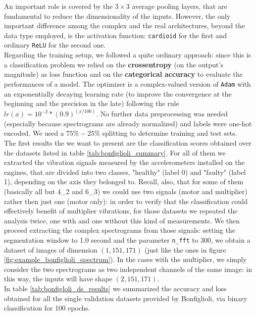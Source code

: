 \documentclass[../main.tex]{subfiles}
\begin{document}
An important role is covered by the $3\times 3$ average pooling layers, that are fundamental to reduce the dimensionality of the inputs. However, the only important difference among the complex and the real architectures, beyond the data type employed, is the activation function: \texttt{cardioid} for the first and ordinary \texttt{ReLU} for the second one.\\
Regarding the training setup, we followed a quite ordinary approach: since this is a classification problem we relied on the \textbf{crossentropy} (on the output's magnitude) as loss function and on the \textbf{categorical accuracy} to evaluate the performances of a model. The optimizer is a complex-valued version of \texttt{Adam} with an exponentially decaying learning rate (to improve the convergence at the beginning and the precision in the late) following the rule $lr(x) = 10^{-2}*(0.9)^{(x/100)}$. No further data preprocessing was needed (especially because spectrograms are already normalized) and labels were one-hot encoded. We used a $75\%-25\%$ splitting to determine training and test sets.\\
The first results the we want to present are the classification scores obtained over the datasets listed in table \ref{tab:bonfiglioli_summary}. For all of them we extracted the vibration signals measured by the accelerometers installed on the engines, that are divided into two classes, "healthy" (label 0) and "faulty" (label 1), depending on the axis they belonged to. Recall, also, that for some of them (basically all but 4\_2 and 6\_3) we could use two signals (motor and multiplier) rather then just one (motor only): in order to verify that the classification could effectively benefit of multiplier vibrations, for those datasets we repeated the analysis twice, one with and one without this kind of measurements. We then proceed extracting the complex spectrograms from those signals: setting the segmentation window to 1.0 second and the parameter \texttt{n\_fft} to 300, we obtain a dataset of images of dimension $(1,151,171)$ (just like the ones in figure \ref{fig:example_bonfiglioli_spectrum}). In the cases with the multiplier, we simply consider the two spectrograms as two independent channels of the same image: in this way, the inputs will have shape $(2,151,171)$.\\
In table \ref{tab:bonfigloli_ds_results} we summarized the accuracy and loss obtained for all the single validation datasets provided by Bonfiglioli, via binary classification for 100 epochs.
\end{document}

